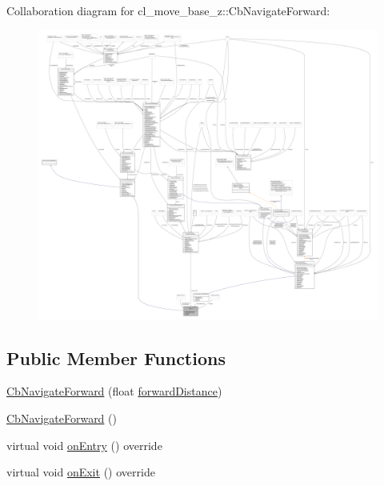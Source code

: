 Collaboration diagram for cl\+\_\+move\+\_\+base\+\_\+z\+:\+:Cb\+Navigate\+Forward\+:
\nopagebreak
\begin{figure}[H]
\begin{center}
\leavevmode
\includegraphics[width=350pt]{classcl__move__base__z_1_1CbNavigateForward__coll__graph}
\end{center}
\end{figure}
\subsection*{Public Member Functions}
\begin{DoxyCompactItemize}
\item 
\hyperlink{classcl__move__base__z_1_1CbNavigateForward_a99ad479eeee7116e68cdb41870223eeb}{Cb\+Navigate\+Forward} (float \hyperlink{classcl__move__base__z_1_1CbNavigateForward_a41bc9c319c64be6302f7365173ccd2c5}{forward\+Distance})
\item 
\hyperlink{classcl__move__base__z_1_1CbNavigateForward_a6322be3ee8a23652a0a9dbe8e203d00e}{Cb\+Navigate\+Forward} ()
\item 
virtual void \hyperlink{classcl__move__base__z_1_1CbNavigateForward_af9a2e49071de287922c3f5963a079b95}{on\+Entry} () override
\item 
virtual void \hyperlink{classcl__move__base__z_1_1CbNavigateForward_a2160484562ef5fb1c655fab7f990241e}{on\+Exit} () override
\end{DoxyCompactItemize}
